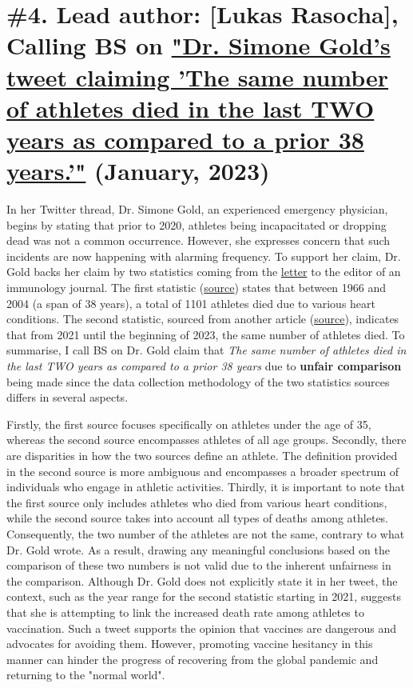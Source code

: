 \documentclass[fleqn,12pt]{article}
\begin{document}
\section{\#4. Lead author: [Lukas Rasocha], Calling BS on \href{https://twitter.com/drsimonegold/status/1610361145294000131?s=20}{"Dr. Simone Gold's tweet claiming 'The same number of athletes died in the last TWO years as 
compared to a prior 38 years.'"} (January, 2023)}
In her Twitter thread, Dr. Simone Gold, an experienced emergency physician, begins by stating that prior to 2020, athletes being incapacitated or dropping dead was not a common occurrence. 
However, she expresses concern that such incidents are now happening with alarming frequency. To support her claim, Dr. Gold backs her claim by two statistics coming from the \href{https://www.ncbi.nlm.nih.gov/pmc/articles/PMC9877705/}{letter} 
to the editor of an immunology journal. The first statistic (\href{https://academic.oup.com/eurjpc/article/13/6/859/5932831}{source}) states that between 1966 and 2004 (a span of 38 years), a total of 1101 athletes died due to various heart conditions. 
The second statistic, sourced from another article (\href{https://goodsciencing.com/covid/athletes-suffer-cardiac-arrest-die-after-covid-shot/}{source}), indicates that from 2021 until the beginning of 2023, the same number of athletes died. 
To summarise, I call BS on Dr. Gold claim that \textit{The same number of athletes died in the last TWO years as compared to a prior 38 years} due to \textbf{unfair comparison} being made since the data collection methodology of the two 
statistics sources differs in several aspects.

Firstly, the first source focuses specifically on athletes under the age of 35, whereas the second source encompasses athletes of all age groups. 
Secondly, there are disparities in how the two sources define an athlete. The definition provided in the second source is more ambiguous and encompasses a 
broader spectrum of individuals who engage in athletic activities. Thirdly, it is important to note that the first source only includes athletes who died from 
various heart conditions, while the second source takes into account all types of deaths among athletes. Consequently, the two number of the athletes are not the same, contrary to what Dr. Gold wrote.
As a result, drawing any meaningful conclusions based on the comparison of these two numbers is not valid due to the inherent unfairness
in the comparison. Although Dr. Gold does not explicitly state it in her tweet, the context, such as the year range for the second statistic starting in 2021, 
suggests that she is attempting to link the increased death rate among athletes to vaccination.
Such a tweet supports the opinion that vaccines are dangerous and advocates for avoiding them. 
However, promoting vaccine hesitancy in this manner can hinder the progress of recovering from the global pandemic and returning to the "normal world".
\newpage
\end{document}
